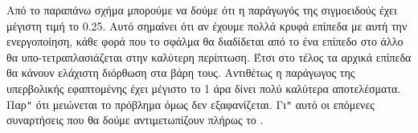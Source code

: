 \begin{figure}[H]
    \centering
    \begin{subfigure}{0.48\textwidth}
        \centering
        \caption{}
    \end{subfigure}
    \hfill
    \begin{subfigure}{0.48\textwidth}
        \centering
        \caption{}
    \end{subfigure}
    \caption{}
\end{figure}
Από το παραπάνω σχήμα μπορούμε να δούμε ότι η παράγωγός της σιγμοειδούς έχει μέγιστη τιμή το 0.25. Αυτό σημαίνει ότι αν έχουμε πολλά κρυφά επίπεδα με αυτή την ενεργοποίηση, κάθε φορά που το σφάλμα θα διαδίδεται από το ένα επίπεδο στο άλλο
θα υπο-τετραπλασιάζεται στην καλύτερη περίπτωση. Έτσι στο τέλος τα αρχικά επίπεδα θα κάνουν ελάχιστη διόρθωση στα βάρη τους. Αντιθέτως η παράγωγος της υπερβολικής εφαπτομένης έχει μέγιστο το 1 άρα δίνει πολύ καλύτερα αποτελέσματα. Παρ\texttt{"} ότι
μειώνεται το πρόβλημα όμως δεν εξαφανίζεται. Γι\texttt{"} αυτό οι επόμενες συναρτήσεις που θα δούμε αντιμετωπίζουν πλήρως το .

